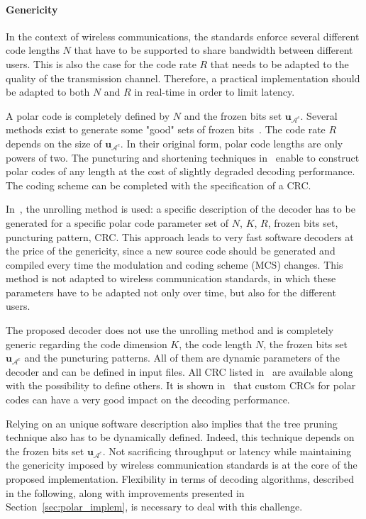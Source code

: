 \paragraph{Genericity}
\label{sec:alg_polar_genericity}

In the context of wireless communications, the standards enforce several
different code lengths $N$ that have to be supported to share bandwidth between
different users. This is also the case for the code rate $R$ that needs to be
adapted to the quality of the transmission channel. Therefore, a practical
implementation should be adapted to both $N$ and $R$ in real-time in order to
limit latency.

A polar code is completely defined by $N$ and the frozen bits set
$\bm{u}_{\mathcal{A}^c}$. Several methods exist to generate some "good" sets of
frozen bits~\cite{Tal2013,Trifonov2012}. The code rate $R$ depends on the size
of $\bm{u}_{\mathcal{A}^c}$. In their original form, polar code lengths are only
powers of two. The puncturing and shortening techniques
in~\cite{Wang2014,Niu2013,Miloslavskaya2015} enable to construct polar codes of
any length at the cost of slightly degraded decoding performance. The coding
scheme can be completed with the specification of a CRC.

In~\cite{Sarkis2016}, the unrolling method is used: a specific description of
the decoder has to be generated for a specific polar code parameter set of $N$,
$K$, $R$, frozen bits set, puncturing pattern, CRC. This approach leads to very
fast software decoders at the price of the genericity, since a new source code
should be generated and compiled every time the modulation and coding scheme
(MCS) changes. This method is not adapted to wireless communication standards,
in which these parameters have to be adapted not only over time, but also for
the different users.

The proposed decoder does not use the unrolling method and is completely generic
regarding the code dimension $K$, the code length $N$, the frozen bits set
$\bm{u}_{\mathcal{A}^c}$ and the puncturing patterns. All of them are dynamic
parameters of the decoder and can be defined in input files. All CRC listed
in~\cite{CRCWiki2017} are available along with the possibility to define others.
It is shown in~\cite{Zhang2017} that custom CRCs for polar codes can have a very
good impact on the decoding performance.

Relying on an unique software description also implies that the tree pruning
technique also has to be dynamically defined. Indeed, this technique depends on
the frozen bits set $\bm{u}_{\mathcal{A}^c}$. Not sacrificing throughput or
latency while maintaining the genericity imposed by wireless communication
standards is at the core of the proposed implementation. Flexibility in terms of
decoding algorithms, described in the following, along with improvements
presented in Section~\ref{sec:polar_implem}, is necessary to deal with this
challenge.

